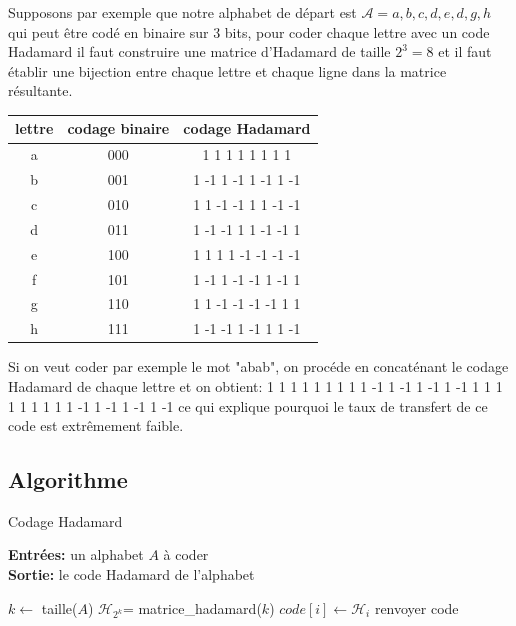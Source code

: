 \documentclass{article}
\begin{document}
Supposons par exemple que notre alphabet de départ est $\mathcal{A} = {a, b, c, d, e, d, g
, h}$ qui peut être codé en binaire sur 3 bits, pour coder chaque lettre avec un code 
Hadamard il faut construire une matrice d'Hadamard de taille $2^3=8$ et il faut établir une
bijection entre chaque lettre et chaque ligne dans la matrice résultante.

\begin{center}
\begin{tabular}{c|c|c}
	\hline 
	lettre & codage binaire & codage Hadamard \\
	\hline
	a & 000 & 1 1 1 1 1 1 1 1 \\
	\hline
	b & 001 & 1 -1 1 -1 1 -1 1 -1 \\
	\hline
	c & 010 & 1 1 -1 -1 1 1 -1 -1 \\
	\hline 
	d & 011 & 1 -1 -1 1 1 -1 -1 1 \\
	\hline 
	e & 100 & 1 1 1 1 -1 -1 -1 -1 \\
	\hline 
	f & 101 & 1 -1 1 -1 -1 1 -1 1 \\
	\hline 
	g & 110 & 1 1 -1 -1 -1 -1 1 1 \\
	\hline 
	h & 111 & 1 -1 -1 1 -1 1 1 -1 \\
	\hline
\end{tabular}
\end{center}

Si on veut coder par exemple le mot "abab", on procéde en concaténant le codage Hadamard de
chaque lettre et on obtient: 
1 1 1 1 1 1 1 1 1 -1 1 -1 1 -1 1 -1 1 1 1 1 1 1 1 1 1 -1 1 -1 1 -1 1 -1
ce qui explique pourquoi le taux de transfert de ce code est extrêmement faible.

\subsection{Algorithme}
\vspace{1em}

\begin{algorithm}
\caption{Codage Hadamard}
	\textbf{Entrées:} un alphabet $A$ à coder\\
    \textbf{Sortie:} le code Hadamard de 
	l'alphabet
	\begin{algorithmic}
		\State $k \gets $ taille($A$) 
		\State $\mathcal{H}_{2^k} $= matrice\_hadamard($k$)
			\State $code[i] \gets \mathcal{H}_{i}$
		\EndFor
		\State renvoyer code
	\end{algorithmic}
\end{algorithm}
\end{document}
